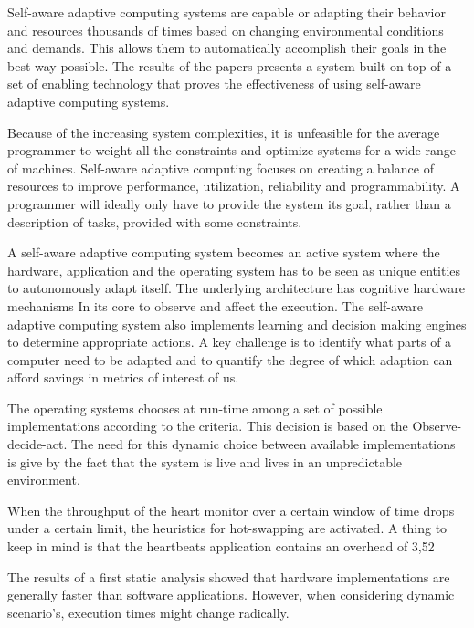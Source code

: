 
Self-aware adaptive computing systems are capable or adapting their behavior and resources thousands of times based on changing environmental conditions and demands. This allows them to automatically accomplish their goals in the best way possible. The results of the papers presents a system built on top of a set of enabling technology that proves the effectiveness of using self-aware adaptive computing systems.

Because of the increasing system complexities, it is unfeasible for the average programmer to weight all the constraints and optimize systems for a wide range of machines. Self-aware adaptive computing focuses on creating a balance of resources to improve performance, utilization, reliability and programmability. A programmer will ideally only have to provide the system its goal, rather than a description of tasks, provided with some constraints.

A self-aware adaptive computing system becomes an active system where the hardware, application and the operating system has to be seen as unique entities to autonomously adapt itself. The underlying architecture has cognitive hardware mechanisms In its core to observe and affect the execution. The self-aware adaptive computing system also implements learning and decision making engines  to determine appropriate actions. A key challenge is to identify what parts of a computer need to be adapted and to quantify the degree of which adaption can afford savings in metrics of interest of us.

The operating systems chooses at run-time among a set of possible implementations according to the criteria. This decision is based on the Observe-decide-act. The need for this dynamic choice between available implementations is give by the fact that the system is live and lives in an unpredictable environment.

When the throughput of the heart monitor over a certain window of time drops under a certain limit, the heuristics for hot-swapping are activated. A thing to keep in mind is that the heartbeats application contains an overhead of 3,52%

The results of a first static analysis showed that hardware implementations are generally faster than software applications. However, when considering dynamic scenario's, execution times might change radically.

